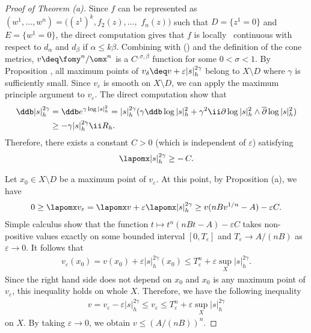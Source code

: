 \documentclass[12pt]{amsart}
\begin{document}
\begin{proof}[Proof of Theorem  (a)] 
Since $f$ can be  represented as $(w^1, \dots, w^n) = ((z^1)^k, f_2(z), \dots,$ $f_n(z))$ such that $D=\{z^1=0 \}$ and $E=\{w^1=0\}$, the direct computation gives that $f$ is locally \holder \ continuous with respect to $d_\alpha $ and $d_\beta $ if $\alpha \le k\beta$. 
Combining with () and the definition of the cone metrics, $v\deq \fomy^n/\omx^n$ is a $C^{, \sigma , \beta }$ function for some $0<\sigma <1$.  
By Proposition , all maximum points of $v_\delta \deq v + \varepsilon |s|_h^{2\gamma }$ belong to $X \setminus D$ where $\gamma$ is sufficiently small.
Since $v_\varepsilon$ is smooth on $X\setminus D$, we can apply the maximum principle argument to $v_\varepsilon$. 
The direct computation show that
\begin{align*}
	\ddb |s|_h^{2\gamma } 
		&= \ddb e^{\gamma \log |s|_h^2}
		   =  |s|_h^{2\gamma } 
			   (
				   \gamma \ddb \log |s|_h^2 
				   + \gamma^2 \ii \partial \log |s|_h^2 \wedge \overline{\partial} \log |s|_h^2 
			   ) \\
		&\ge - \gamma |s|_h^{2\gamma } \ii R_h.
\end{align*}
Therefore, there exists a constant $C >0 $ (which is independent of $\varepsilon$) satisfying
\begin{align*}
	\lapomx |s|_h^{2\gamma } \ge -  \, C.
\end{align*}

Let $x_0 \in X\setminus D$ be a maximum point of $v_\varepsilon$.  At this point, by Proposition  (a), we have
\begin{align*}
	0 \ge \lapomx v_\varepsilon = \lapomx v + \varepsilon \lapomx |s|_h^{2\gamma }  \ge  v ( nB  v^{1/n} - A  ) -\varepsilon C.
\end{align*}
Simple calculus show that the function $t \mapsto t^n(nBt-A) -\varepsilon C $ takes non-positive values exactly on some bounded interval $[0, T_\varepsilon]$ and $T_\varepsilon \rightarrow A/(nB)$ as $\varepsilon \rightarrow 0$. 
It follows that
\begin{align*}
	v_\varepsilon(x_0) = v(x_0) + \varepsilon |s|_h^{2\gamma }(x_0)  \le T_\varepsilon^{n} + \varepsilon \sup_X |s|_h^{2\gamma }.
\end{align*}
Since the right hand side does not depend on $x_0$ and $x_0$ is any maximum point of $v_\varepsilon$, this inequality holds on whole $X$. 
Therefore, we have the following inequality 
\begin{align*}
	v= v_\varepsilon - \varepsilon |s|_h^{2\gamma }  \le v_\varepsilon \le T_\varepsilon^{n} + \varepsilon \sup_X |s|_h^{2\gamma }
\end{align*}
on $X$. By taking $\varepsilon\rightarrow 0$, we obtain $v\le (A/(nB))^{n}$.
\end{proof}
\end{document}
